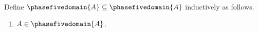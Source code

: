 \begin{inductive}\label{phase5_recursive_domain}
    Define $\phasefivedomain{A}\subseteq\phasefivedomain{A}$ inductively as follows.
    \begin{enumerate}
        \item $A\in\phasefivedomain{A}$.
    \end{enumerate}
\end{inductive}

